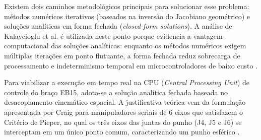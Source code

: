 Existem dois caminhos metodológicos principais para solucionar esse problema: métodos numéricos iterativos (baseados na inversão do Jacobiano geométrico) e soluções analíticas em forma fechada (\textit{closed-form solutions}). A análise de Kalaycioglu et al. é utilizada neste ponto porque evidencia a vantagem computacional das soluções analíticas: enquanto os métodos numéricos exigem múltiplas iterações em ponto flutuante, a forma fechada reduz sobrecarga de processamento e indeterminismo temporal em microcontroladores de baixo custo \cite{kalaycioglu2024analytical}.

Para viabilizar a execução em tempo real na CPU (\textit{Central Processing Unit}) de controle do braço EB15, adota-se a solução analítica fechada baseada no desacoplamento cinemático espacial. A justificativa teórica vem da formulação apresentada por Craig para manipuladores seriais de 6 eixos que satisfazem o Critério de Pieper, no qual os três eixos das juntas do punho (J4, J5 e J6) se interceptam em um único ponto comum, caracterizando um punho esférico \cite{craig2005introduction}. 

